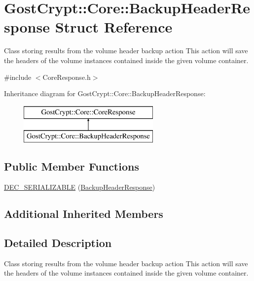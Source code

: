 \hypertarget{struct_gost_crypt_1_1_core_1_1_backup_header_response}{}\section{Gost\+Crypt\+:\+:Core\+:\+:Backup\+Header\+Response Struct Reference}
\label{struct_gost_crypt_1_1_core_1_1_backup_header_response}


Class storing results from the volume header backup action This action will save the headers of the volume instances contained inside the given volume container.  




{\ttfamily \#include $<$Core\+Response.\+h$>$}

Inheritance diagram for Gost\+Crypt\+:\+:Core\+:\+:Backup\+Header\+Response\+:\begin{figure}[H]
\begin{center}
\leavevmode
\includegraphics[height=2.000000cm]{struct_gost_crypt_1_1_core_1_1_backup_header_response}
\end{center}
\end{figure}
\subsection*{Public Member Functions}
\begin{DoxyCompactItemize}
\item 
\hyperlink{struct_gost_crypt_1_1_core_1_1_backup_header_response_a1fbac9f6758193b7871db184b2179acf}{D\+E\+C\+\_\+\+S\+E\+R\+I\+A\+L\+I\+Z\+A\+B\+LE} (\hyperlink{struct_gost_crypt_1_1_core_1_1_backup_header_response}{Backup\+Header\+Response})
\end{DoxyCompactItemize}
\subsection*{Additional Inherited Members}


\subsection{Detailed Description}
Class storing results from the volume header backup action This action will save the headers of the volume instances contained inside the given volume container. 

